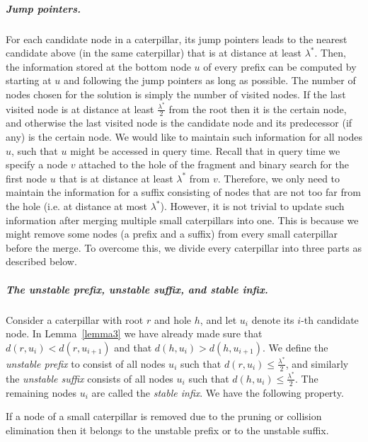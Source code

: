 \documentclass[a4paper,UKenglish]{lipics-v2016}
\theoremstyle{plain}
\renewcommand{\paragraph}{\subparagraph}
\begin{document}
\paragraph{Jump pointers.} For each candidate node in a caterpillar, its jump pointers leads to the nearest
candidate above (in the same caterpillar) that is at distance at least $\lambda^{*}$. Then, the information
stored at the bottom node $u$ of every prefix can be computed by starting at $u$ and following
the jump pointers as long as possible. The number of nodes chosen for the solution is simply the number of visited
nodes. If the last visited node is at distance at least $\frac{\lambda^{*}}{2}$ from the root then it is
the certain node, and otherwise the last visited node is the candidate node and its predecessor
(if any) is the certain node. We would like to maintain such information for all nodes $u$,
such that $u$ might be accessed in query time. Recall that in query time we specify
a node $v$ attached to the hole of the fragment and binary search for the first node $u$ that
is at distance at least $\lambda^{*}$ from $v$. Therefore, we only need to maintain the information
for a suffix consisting of nodes that are not too far from the hole (i.e. at distance at most $\lambda^{*}$). However, it is not
 trivial to update such information after merging multiple small caterpillars into
one. This is because we might remove some nodes (a prefix and a suffix)
from every small caterpillar before the merge. To overcome this, we divide every caterpillar into
three parts as described below.

\paragraph{The unstable prefix,  unstable  suffix, and stable infix.} 


Consider a caterpillar with root $r$ and hole $h$, and let $u_{i}$ denote its $i$-th candidate node. In Lemma~\ref{lemma3} we have already made sure that $d(r,u_{i}) < d(r,u_{i+1})$
and that $d(h,u_{i}) > d(h,u_{i+1})$. We define the \emph{unstable prefix} to
consist of all nodes $u_{i}$ such that $d(r,u_{i})\leq \frac{\lambda^{*}}{2}$, and similarly the
\emph{unstable suffix} consists of all nodes $u_{i}$ such that $d(h,u_{i})\leq \frac{\lambda^{*}}{2}$.
The remaining nodes $u_{i}$ are called the \emph{stable infix}.  We have the following property.

\begin{lemma}
\label{stable infix}
If a node of a small caterpillar is removed due to the pruning or collision elimination then it
belongs to the unstable prefix or to the unstable suffix.
\end{lemma}
\end{document}
